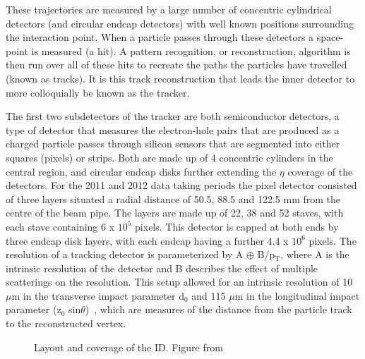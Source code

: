 These trajectories are measured by a large number of concentric cylindrical detectors (and circular endcap detectors)  with well known positions surrounding the interaction point.  
When a particle passes through these detectors a space-point is measured (a hit).  
A pattern recognition, or reconstruction, algorithm is then run over all of these hits to recreate the paths the particles have travelled (known as tracks).  
It is this track reconstruction that leads the inner detector to more colloquially be known as the tracker.  

The first two subdetectors of the tracker are both semiconductor detectors, a type of detector that measures the electron-hole pairs that are produced as a charged particle passes through silicon sensors that are segmented into either squares (pixels) or strips.  
Both are made up of 4 concentric cylinders in the central region, and circular endcap disks further extending the $\eta$ coverage of the detectors.  
For the 2011 and 2012 data taking periods the pixel detector consisted of three layers situated a radial distance of 50.5, 88.5 and 122.5 mm from the centre of the beam pipe.  
The layers are made up of 22, 38 and 52 staves, with each stave containing 6 x $10^5$ pixels.  
This detector is capped at both ends by three endcap disk layers, with each endcap having a further 4.4 x $10^6$ pixels.  
The resolution of a tracking detector is parameterized by A $\oplus$ B/p$_{\mathrm{T}}$, where A is the intrinsic resolution of the detector and B describes the effect of multiple scatterings on the resolution.  
This setup allowed for an intrinsic resolution of 10 $\mu$m in the transverse impact parameter d$_{0}$ and 115 $\mu$m in the longitudinal impact parameter (z$_{0}$ sin$\theta$)~\cite{ID3}, which are measures of the distance from the particle track to the reconstructed vertex. 

\begin{figure}[!ht]
 \begin{center}
 \end{center}
 \caption[Layout and coverage of the ID]
 {\small Layout and coverage of the ID.  Figure from ~\cite{Iwamoto:2013kla}}
 \label{IDCoverage}
\end{figure} 

